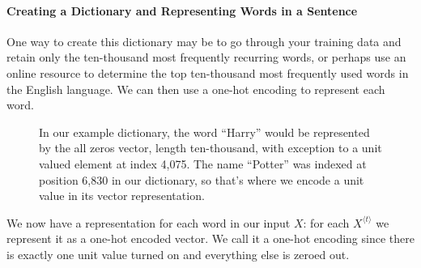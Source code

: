 \documentclass[12pt]{article}
\begin{document}
\paragraph{Creating a Dictionary and Representing Words in a Sentence}
One way to create this dictionary may be to go through your training data and retain only the ten-thousand most frequently recurring words, or perhaps use an online resource to determine the top ten-thousand most frequently used words in the English language. We can then use a one-hot encoding to represent each word. 
\begin{figure}[h]
  \centering
  \caption{\footnotesize In our example dictionary, the word ``Harry'' would be represented by the all zeros vector, length ten-thousand, with exception to a unit valued element at index 4,075. The name ``Potter'' was indexed at position 6,830 in our dictionary, so that's where we encode a unit value in its vector representation.}
\end{figure}

We now have a representation for each word in our input $X$: for each $X^{\langle t \rangle}$ we represent it as a one-hot encoded vector. We call it a one-hot encoding since there is exactly one unit value turned on and everything else is zeroed out.
\end{document}
